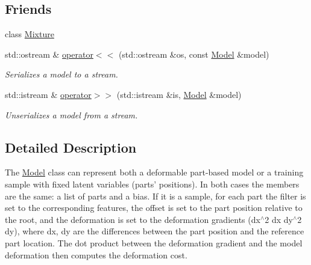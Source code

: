 \subsection*{Friends}
\begin{DoxyCompactItemize}
\item 
class \hyperlink{class_f_f_l_d_1_1_model_a1686bded4573f97d73fc11dba1000018}{Mixture}
\item 
\hypertarget{class_f_f_l_d_1_1_model_a39cd698b774d73886d303cebe56c31fe}{std\-::ostream \& \hyperlink{class_f_f_l_d_1_1_model_a39cd698b774d73886d303cebe56c31fe}{operator$<$$<$} (std\-::ostream \&os, const \hyperlink{class_f_f_l_d_1_1_model}{Model} \&model)}\label{class_f_f_l_d_1_1_model_a39cd698b774d73886d303cebe56c31fe}

\begin{DoxyCompactList}\small\item\em Serializes a model to a stream. \end{DoxyCompactList}\item 
\hypertarget{class_f_f_l_d_1_1_model_ae500bc06913d52a6b65b3813704ca103}{std\-::istream \& \hyperlink{class_f_f_l_d_1_1_model_ae500bc06913d52a6b65b3813704ca103}{operator$>$$>$} (std\-::istream \&is, \hyperlink{class_f_f_l_d_1_1_model}{Model} \&model)}\label{class_f_f_l_d_1_1_model_ae500bc06913d52a6b65b3813704ca103}

\begin{DoxyCompactList}\small\item\em Unserializes a model from a stream. \end{DoxyCompactList}\end{DoxyCompactItemize}


\subsection{Detailed Description}
The \hyperlink{class_f_f_l_d_1_1_model}{Model} class can represent both a deformable part-\/based model or a training sample with fixed latent variables (parts' positions). In both cases the members are the same\-: a list of parts and a bias. If it is a sample, for each part the filter is set to the corresponding features, the offset is set to the part position relative to the root, and the deformation is set to the deformation gradients ({\ttfamily dx$^\wedge$2 dx dy$^\wedge$2 dy}), where dx, dy are the differences between the part position and the reference part location. The dot product between the deformation gradient and the model deformation then computes the deformation cost. 

